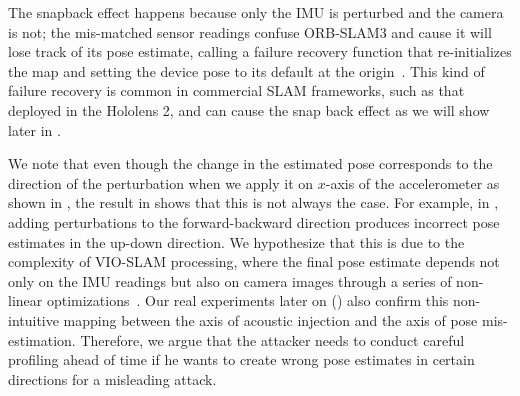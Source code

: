 The snapback effect happens because only the IMU is perturbed and the camera is not; the mis-matched sensor readings confuse ORB-SLAM3 and cause it will lose track of its pose estimate, calling a failure recovery function that re-initializes the map and setting the device pose to its default at the origin~\cite{campos2021orb}.
This kind of failure recovery is common in commercial SLAM frameworks, such as that deployed in the Hololens 2, and can cause the snap back effect as we will show later in .

We note that even though the change in the estimated pose corresponds to the direction of the perturbation when we apply it on $x$-axis of the accelerometer as shown in , the result in  shows that this is not always the case.
For example, in , adding perturbations to the forward-backward direction produces incorrect pose estimates in the up-down direction.
We hypothesize that this is due to the complexity of VIO-SLAM processing, where the final pose estimate depends not only on the IMU readings but also on camera images through a series of non-linear optimizations~\cite{campos2021orb}.
Our real experiments later on () also confirm this non-intuitive mapping between the axis of acoustic injection and the axis of pose mis-estimation.
Therefore, we argue that the attacker needs to conduct careful profiling ahead of time if he wants to create wrong pose estimates in certain directions for a misleading attack.



